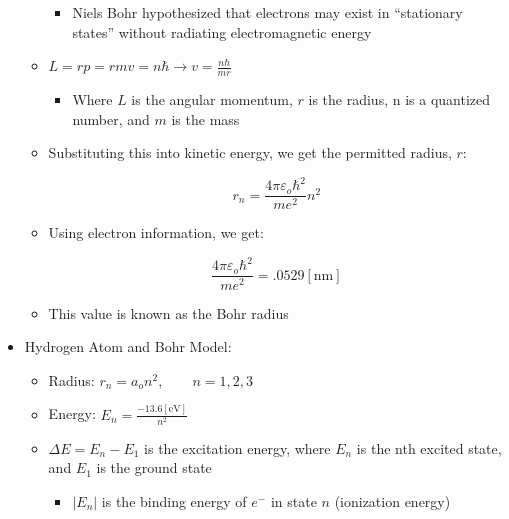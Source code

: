 \begin{itemize}
\begin{itemize}
        \begin{itemize}

          \item Niels Bohr hypothesized that electrons may exist in ``stationary states'' without radiating electromagnetic energy

        \end{itemize}

      \item $L = rp = rmv = n\hbar \rightarrow v = \frac{n\hbar}{mr}$

        \begin{itemize}

          \item Where $L$ is the angular momentum, $r$ is the radius, n is a quantized number, and $m$ is the mass

        \end{itemize}

      \item Substituting this into kinetic energy, we get the permitted radius, $r$:

        $$\boxed{r_n=\frac{4\pi\varepsilon_o\hbar^2}{me^2}n^2}$$

      \item Using electron information, we get:

        $$\frac{4\pi\varepsilon_o\hbar^2}{me^2}=.0529[\si{\nano\meter}]$$

      \item This value is known as the Bohr radius

    \end{itemize}

  \item Hydrogen Atom and Bohr Model:

    \begin{itemize}

      \item Radius: $r_n=a_on^2,\quad\quad n=1,2,3$

      \item Energy: $E_n=\frac{-13.6[\si{\eV}]}{n^2}$

      \item $\Delta E = E_n - E_1$ is the excitation energy, where $E_n$ is the nth excited state, and $E_1$ is the ground state

        \begin{itemize}

          \item $|E_n|$ is the binding energy of $e^-$ in state $n$ (ionization energy)


\end{itemize}
\end{itemize}
\end{itemize}
